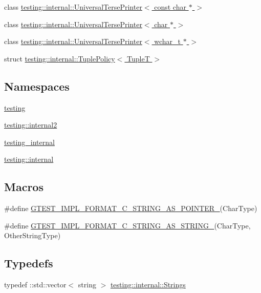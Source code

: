 \begin{DoxyCompactItemize}
\item 
class \hyperlink{classtesting_1_1internal_1_1_universal_terse_printer_3_01const_01char_01_5_01_4}{testing\+::internal\+::\+Universal\+Terse\+Printer$<$ const char $\ast$ $>$}
\item 
class \hyperlink{classtesting_1_1internal_1_1_universal_terse_printer_3_01char_01_5_01_4}{testing\+::internal\+::\+Universal\+Terse\+Printer$<$ char $\ast$ $>$}
\item 
class \hyperlink{classtesting_1_1internal_1_1_universal_terse_printer_3_01wchar__t_01_5_01_4}{testing\+::internal\+::\+Universal\+Terse\+Printer$<$ wchar\+\_\+t $\ast$ $>$}
\item 
struct \hyperlink{structtesting_1_1internal_1_1_tuple_policy}{testing\+::internal\+::\+Tuple\+Policy$<$ Tuple\+T $>$}
\end{DoxyCompactItemize}
\subsection*{Namespaces}
\begin{DoxyCompactItemize}
\item 
 \hyperlink{namespacetesting}{testing}
\item 
 \hyperlink{namespacetesting_1_1internal2}{testing\+::internal2}
\item 
 \hyperlink{namespacetesting__internal}{testing\+\_\+internal}
\item 
 \hyperlink{namespacetesting_1_1internal}{testing\+::internal}
\end{DoxyCompactItemize}
\subsection*{Macros}
\begin{DoxyCompactItemize}
\item 
\#define \hyperlink{gtest-printers_8h_a79d4724b4bc2a1dd8493c366b5ca626a}{G\+T\+E\+S\+T\+\_\+\+I\+M\+P\+L\+\_\+\+F\+O\+R\+M\+A\+T\+\_\+\+C\+\_\+\+S\+T\+R\+I\+N\+G\+\_\+\+A\+S\+\_\+\+P\+O\+I\+N\+T\+E\+R\+\_\+}(Char\+Type)
\item 
\#define \hyperlink{gtest-printers_8h_ad6102ed2a0571d5196e606a061c16a10}{G\+T\+E\+S\+T\+\_\+\+I\+M\+P\+L\+\_\+\+F\+O\+R\+M\+A\+T\+\_\+\+C\+\_\+\+S\+T\+R\+I\+N\+G\+\_\+\+A\+S\+\_\+\+S\+T\+R\+I\+N\+G\+\_\+}(Char\+Type,  Other\+String\+Type)
\end{DoxyCompactItemize}
\subsection*{Typedefs}
\begin{DoxyCompactItemize}
\item 
typedef \+::std\+::vector$<$ string $>$ \hyperlink{namespacetesting_1_1internal_a7706b17f05f4b49e351b052ae4e05073}{testing\+::internal\+::\+Strings}
\end{DoxyCompactItemize}
